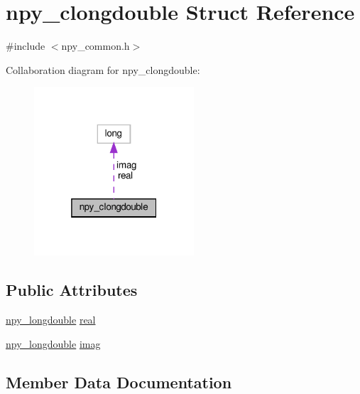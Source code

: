 \hypertarget{structnpy__clongdouble}{}\section{npy\+\_\+clongdouble Struct Reference}
\label{structnpy__clongdouble}


{\ttfamily \#include $<$npy\+\_\+common.\+h$>$}



Collaboration diagram for npy\+\_\+clongdouble\+:
\nopagebreak
\begin{figure}[H]
\begin{center}
\leavevmode
\includegraphics[width=169pt]{structnpy__clongdouble__coll__graph}
\end{center}
\end{figure}
\subsection*{Public Attributes}
\begin{DoxyCompactItemize}
\item 
\hyperlink{npy__common_8h_ad677a4063faf32de2fe57fdf0fbbf1fa}{npy\+\_\+longdouble} \hyperlink{structnpy__clongdouble_a0c1428764f767854aa68b3f5869929b4}{real}
\item 
\hyperlink{npy__common_8h_ad677a4063faf32de2fe57fdf0fbbf1fa}{npy\+\_\+longdouble} \hyperlink{structnpy__clongdouble_aca26f55b28c2c86f9e1edffe169a30af}{imag}
\end{DoxyCompactItemize}


\subsection{Member Data Documentation}
\mbox{\label{structnpy__clongdouble_aca26f55b28c2c86f9e1edffe169a30af}} 
